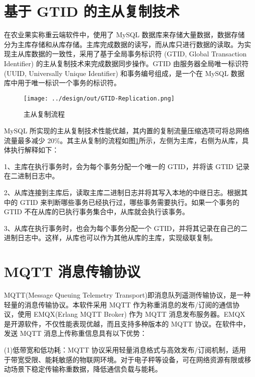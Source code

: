 \section{基于 GTID 的主从复制技术}\label{sec:gtid}

在农业果实称重云端软件中，使用了 MySQL 数据库来存储大量数据，数据存储分为主库存储和从库存储。主库完成数据的读写，而从库只进行数据的读取。为实现主从库数据的一致性，采用了基于全局事务标识符 (GTID, Global Transaction Identifier) 的主从复制技术来完成数据同步操作。GTID 由服务器全局唯一标识符(UUID, Universally Unique Identifier) 和事务编号组成，是一个在 MySQL 数据库中用于唯一标识一个事务的标识符。

\begin{figure}
    \centering
    \texttt{[image: ../design/out/GTID-Replication.png]}
    \caption{主从复制流程}
    \label{fig:GTID-Replication}
\end{figure}

MySQL 所实现的主从复制技术性能优越，其内置的复制流量压缩选项可将总网络流量最多减少 20\%\cite{shehzad2020networkfootprintreplicationpopular}。其主从复制的流程如图\ref{fig:GTID-Replication}所示，左侧为主库，右侧为从库，具体执行解释如下：

1、主库在执行事务时，会为每个事务分配一个唯一的 GTID，并将该 GTID 记录在二进制日志中。

2、从库连接到主库后，读取主库二进制日志并将其写入本地的中继日志。根据其中的 GTID 来判断哪些事务已经执行过，哪些事务需要执行。如果一个事务的 GTID 不在从库的已执行事务集合中，从库就会执行该事务。

3、从库在执行事务时，也会为每个事务分配一个 GTID，并将其记录在自己的二进制日志中。这样，从库也可以作为其他从库的主库，实现级联复制\cite{MySQL-Liu2022}。

\section{MQTT 消息传输协议}\label{sec:mqtt}

MQTT(Message Queuing Telemetry Transport)即消息队列遥测传输协议，是一种轻量的消息传输协议。本软件采用 MQTT 作为称重消息的发布/订阅的通信协议，使用 EMQX(Erlang MQTT Broker) 作为 MQTT 消息发布服务器。EMQX 是开源软件，不仅性能表现优越，而且支持多种版本的 MQTT 协议\cite{dizdarevic2023engineeringexperimentallybenchmarkingopen}。在软件中，发送 MQTT 消息上传称重信息具有以下优势：

(1)低带宽和低功耗：MQTT 协议采用轻量消息格式与高效发布/订阅机制，适用于带宽受限、能耗敏感的物联网环境。对于电子秤等设备，可在网络资源有限或移动场景下稳定传输称重数据，降低通信负载与能耗\cite{Jia2015}。

